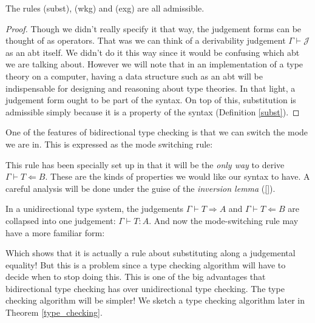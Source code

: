 \begin{lemma}
    The rules (subst), (wkg) and (exg) are all admissible.
\end{lemma}

\begin{proof}
    Though we didn't really specify it that way, the judgement forms can be thought of as operators. That was we can think of a derivability judgement $\Gamma \vdash \mathcal{J}$ as an abt itself. We didn't do it this way since it would be confusing which abt we are talking about. However we will note that in an implementation of a type theory on a computer, having a data structure such as an abt will be indispensable for designing and reasoning about type theories. In that light, a judgement form ought to be part of the syntax. On top of this, substitution is admissible simply because it is a property of the syntax (Definition \ref{subst}).
\end{proof}

\begin{defin}
    One of the features of bidirectional type checking is that we can switch the mode we are in. This is expressed as the mode switching rule:

    \begin{prooftree}
    \end{prooftree}
\end{defin}

\begin{remark}
    This rule has been specially set up in that it will be the \emph{only way} to derive $\Gamma \vdash T \Leftarrow B$. These are the kinds of properties we would like our syntax to have. A careful analysis will be done under the guise of the \emph{inversion lemma} (\ref{}).

    In a unidirectional type system, the judgements $\Gamma \vdash T \Rightarrow A$ and $\Gamma \vdash T \Leftarrow B$ are collapsed into one judgement: $\Gamma \vdash T : A$. And now the mode-switching rule may have a more familiar form:

    \begin{prooftree}
    \end{prooftree}

    Which shows that it is actually a rule about substituting along a judgemental equality! But this is a problem since a type checking algorithm will have to decide when to stop doing this. This is one of the big advantages that bidirectional type checking has over unidirectional type checking. The type checking algorithm will be simpler! \cite{COQUAND1996167} We sketch a type checking algorithm later in Theorem \ref{type_checking}.
\end{remark}

